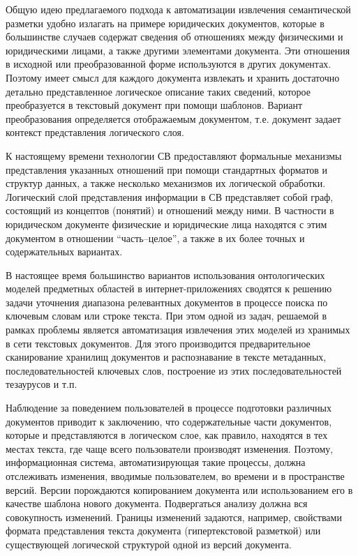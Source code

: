 \documentclass[utf8]{../IncArticle}
\begin{document}
Общую идею предлагаемого подхода к автоматизации извлечения семантической
разметки удобно излагать на примере юридических документов, которые в
большинстве случаев содержат сведения об отношениях между физическими
и юридическими лицами, а также другими элементами документа.  Эти отношения в
исходной или преобразованной форме используются в других документах.
Поэтому имеет смысл для каждого документа извлекать и хранить
достаточно детально представленное логическое описание таких сведений,
которое преобразуется в текстовый документ при помощи шаблонов.
Вариант преобразования определяется отображаемым документом,
т.е. документ задает контекст представления логического слоя.

К настоящему времени технологии СВ предоставляют формальные механизмы
представления указанных отношений при помощи стандартных форматов и
структур данных, а также несколько механизмов их логической обработки.
Логический слой представления информации в СВ представляет собой граф,
состоящий из концептов (понятий) и отношений между ними.  В частности
в юридическом документе физические и юридические лица находятся с этим
документом в отношении ``часть--целое'', а также в их более точных и
содержательных вариантах.

В настоящее время большинство вариантов использования онтологических
моделей предметных областей в интернет-приложениях сводятся к решению задачи уточнения
диапазона релевантных документов в процессе поиска по ключевым словам
или строке текста.  При этом одной из задач, решаемой в рамках
проблемы является автоматизация извлечения этих моделей из хранимых в сети текстовых
документов.   Для этого производится предварительное сканирование
хранилищ документов и распознавание в тексте метаданных, последовательностей
ключевых слов, построение из этих последовательностей тезаурусов и
т.п.

Наблюдение за поведением пользователей в процессе подготовки различных
документов приводит к заключению, что содержательные части документов,
которые и представляются в логическом слое, как правило, находятся в
тех местах текста, где чаще всего пользователи производят изменения.
Поэтому, информационная система, автоматизирующая такие процессы,
должна отслеживать изменения, вводимые пользователем, во времени и в
пространстве версий.  Версии порождаются копированием документа или
использованием его в качестве шаблона нового документа.  Подвергаться
анализу должна вся совокупность изменений.  Границы изменений
задаются, например, свойствами формата представления текста документа
(гипертекстовой разметкой) или существующей логической структурой
одной из версий документа.
\end{document}
